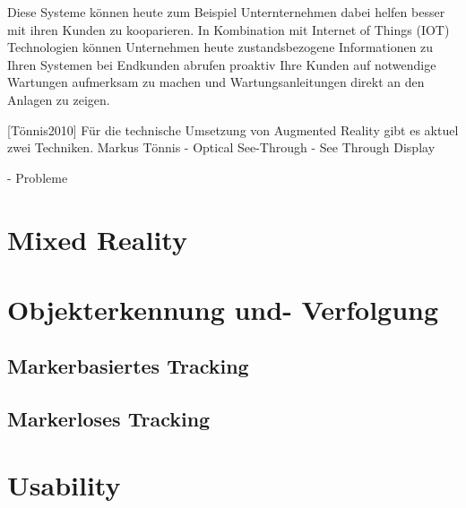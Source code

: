 Diese Systeme können heute zum Beispiel Unternternehmen dabei helfen besser mit ihren Kunden zu kooparieren. In Kombination mit Internet of Things (IOT) Technologien können Unternehmen heute
zustandsbezogene Informationen zu Ihren Systemen bei Endkunden abrufen proaktiv Ihre Kunden auf notwendige Wartungen aufmerksam zu machen und Wartungsanleitungen direkt an den Anlagen zu zeigen.

[Tönnis2010] Für die technische Umsetzung von Augmented Reality gibt es aktuel zwei Techniken. 
Markus Tönnis
- Optical See-Through
- See Through Display


-  Probleme

\section{Mixed Reality}



\section{Objekterkennung und- Verfolgung}



\subsection{Markerbasiertes Tracking}



\subsection{Markerloses Tracking}



\section{Usability}

